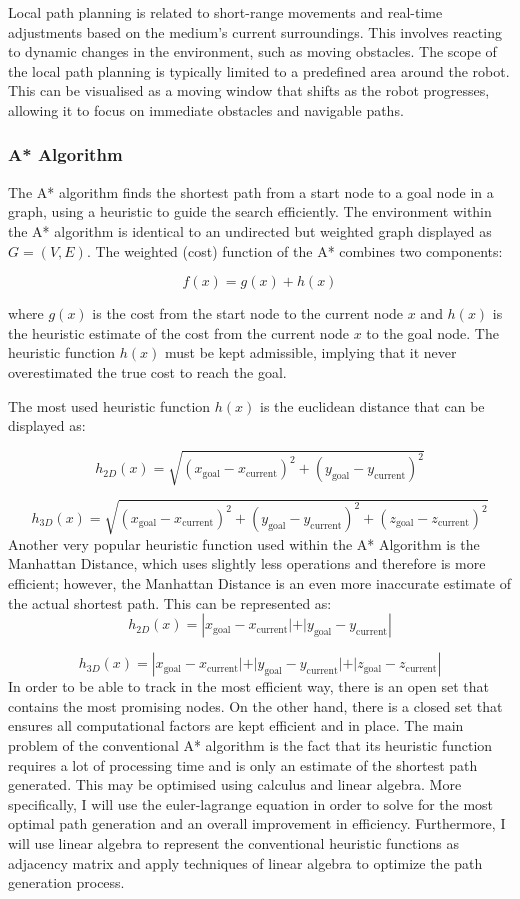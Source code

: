 \documentclass[12pt]{article}
\begin{document}
Local path planning is related to short-range movements and real-time adjustments based on the medium's current surroundings. This involves reacting to dynamic changes in the environment, such as moving obstacles. The scope of the local path planning is typically limited to a predefined area around the robot. This can be visualised as a moving window that shifts as the robot progresses, allowing it to focus on immediate obstacles and navigable paths.

\subsubsection{A* Algorithm}
The A* algorithm finds the shortest path from a start node to a goal node in a graph, using a heuristic to guide the search efficiently. The environment within the A* algorithm is identical to an undirected but weighted graph displayed as $G = (V, E)$. The weighted (cost) function of the A* combines two components:

\[
f(x) = g(x) + h(x)
\]

where $g(x)$ is the cost from the start node to the current node $x$ and $h(x)$ is the heuristic estimate of the cost from the current node $x$ to the goal node. The heuristic function $h(x)$ must be kept admissible, implying that it never overestimated the true cost to reach the goal.

The most used heuristic function $h(x)$ is the euclidean distance that can be displayed as:

\[
h_{2D}(x) = \sqrt{(x_{\text{goal}} - x_{\text{current}})^2 + (y_{\text{goal}} - y_{\text{current}})^2}
\]

\[
h_{3D}(x) = \sqrt{(x_{\text{goal}} - x_{\text{current}})^2 + (y_{\text{goal}} - y_{\text{current}})^2 + (z_{\text{goal}} - z_{\text{current}})^2}
\]
Another very popular heuristic function used within the A* Algorithm is the Manhattan Distance, which uses slightly less operations and therefore is more efficient; however, the Manhattan Distance is an even more inaccurate estimate of the actual shortest path. This can be represented as:
\[
h_{2D}(x) = |{x_{\text{goal}} - x_{\text{current}}| + |y_{\text{goal}} - y_{\text{current}}}|
\]

\[
h_{3D}(x) = |{x_{\text{goal}} - x_{\text{current}}| + |y_{\text{goal}} - y_{\text{current}}| + |z_{\text{goal}} - z_{\text{current}}}|
\]
In order to be able to track in the most efficient way, there is an open set that contains the most promising nodes. On the other hand, there is a closed set that ensures all computational factors are kept efficient and in place. The main problem of the conventional A* algorithm is the fact that its heuristic function requires a lot of processing time and is only an estimate of the shortest path generated. This may be optimised using calculus and linear algebra. More specifically, I will use the euler-lagrange equation in order to solve for the most optimal path generation and an overall improvement in efficiency. Furthermore, I will use linear algebra to represent the conventional heuristic functions as adjacency matrix and apply techniques of linear algebra to optimize the path generation process. 
\newpage
\end{document}
